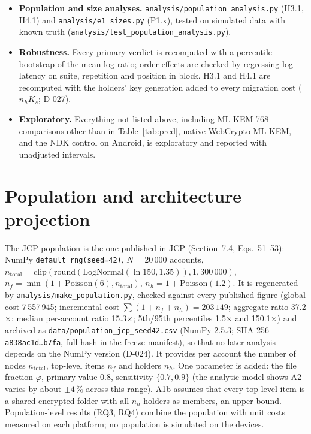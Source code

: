 \documentclass[11pt,a4paper]{article}
\begin{document}
\begin{itemize}
\item \textbf{Population and size analyses.} \texttt{analysis/\allowbreak{}population\_\allowbreak{}analysis.py} (H3.1, H4.1) and \texttt{analysis/\allowbreak{}e1\_\allowbreak{}sizes.py} (P1.x), tested on simulated data with known truth (\texttt{analysis/\allowbreak{}test\_\allowbreak{}population\_\allowbreak{}analysis.py}).
\item \textbf{Robustness.} Every primary verdict is recomputed with a percentile bootstrap of the mean log ratio; order effects are checked by regressing log latency on suite, repetition and position in block. H3.1 and H4.1 are recomputed with the holders' key generation added to every migration cost ($n_h K_s$; D-027).
\item \textbf{Exploratory.} Everything not listed above, including ML-KEM-768 comparisons other than in Table~\ref{tab:pred}, native WebCrypto ML-KEM, and the NDK control on Android, is exploratory and reported with unadjusted intervals.
\end{itemize}

\section{Population and architecture projection}\label{sec:population}
The JCP population is the one published in JCP (Section~7.4, Eqs.~51--53): NumPy \texttt{default\_\allowbreak{}rng(seed=42)}, $N = 20\,000$ accounts, $n_{\mathrm{total}} = \mathrm{clip}(\mathrm{round}(\mathrm{LogNormal}(\ln 150, 1.35)), 1, 300\,000)$, $n_f = \min(1 + \mathrm{Poisson}(6), n_{\mathrm{total}})$, $n_h = 1 + \mathrm{Poisson}(1.2)$. It is regenerated by \texttt{analysis/\allowbreak{}make\_\allowbreak{}population.py}, checked against every published figure (global cost 7\,557\,945; incremental cost $\sum(1 + n_f + n_h) = 203\,149$; aggregate ratio 37.2$\times$; median per-account ratio 15.3$\times$; 5th/95th percentiles 1.5$\times$ and 150.1$\times$) and archived as \texttt{data/\allowbreak{}population\_\allowbreak{}jcp\_\allowbreak{}seed42.csv} (NumPy 2.5.3; SHA-256 \texttt{a838ac1d\ldots b7fa}, full hash in the freeze manifest), so that no later analysis depends on the NumPy version (D-024). It provides per account the number of nodes $n_{\mathrm{total}}$, top-level items $n_f$ and holders $n_h$. One parameter is added: the file fraction $\varphi$, primary value 0.8, sensitivity $\{0.7, 0.9\}$ (the analytic model shows A2 varies by about $\pm4\,\%$ across this range). A1b assumes that every top-level item is a shared encrypted folder with all $n_h$ holders as members, an upper bound. Population-level results (RQ3, RQ4) combine the population with unit costs measured on each platform; no population is simulated on the devices.
\end{document}
